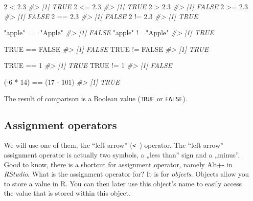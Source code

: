 \documentclass[
]{book}
\newenvironment{Shaded}{\begin{snugshade}}{\end{snugshade}}
\newcommand{\CommentTok}[1]{\textcolor[rgb]{0.56,0.35,0.01}{\textit{#1}}}
\newcommand{\ConstantTok}[1]{\textcolor[rgb]{0.00,0.00,0.00}{#1}}
\newcommand{\DecValTok}[1]{\textcolor[rgb]{0.00,0.00,0.81}{#1}}
\newcommand{\FloatTok}[1]{\textcolor[rgb]{0.00,0.00,0.81}{#1}}
\newcommand{\NormalTok}[1]{#1}
\newcommand{\SpecialCharTok}[1]{\textcolor[rgb]{0.00,0.00,0.00}{#1}}
\newcommand{\StringTok}[1]{\textcolor[rgb]{0.31,0.60,0.02}{#1}}
\begin{document}
\begin{Shaded}
\begin{Highlighting}[]
\DecValTok{2} \SpecialCharTok{\textless{}} \FloatTok{2.3}
\CommentTok{\#\textgreater{} [1] TRUE}
\DecValTok{2} \SpecialCharTok{\textless{}=} \FloatTok{2.3}
\CommentTok{\#\textgreater{} [1] TRUE}
\DecValTok{2} \SpecialCharTok{\textgreater{}} \FloatTok{2.3}
\CommentTok{\#\textgreater{} [1] FALSE}
\DecValTok{2} \SpecialCharTok{\textgreater{}=} \FloatTok{2.3}
\CommentTok{\#\textgreater{} [1] FALSE}
\DecValTok{2} \SpecialCharTok{==} \FloatTok{2.3}
\CommentTok{\#\textgreater{} [1] FALSE}
\DecValTok{2} \SpecialCharTok{!=} \FloatTok{2.3}
\CommentTok{\#\textgreater{} [1] TRUE}

\StringTok{"apple"} \SpecialCharTok{==} \StringTok{"Apple"}
\CommentTok{\#\textgreater{} [1] FALSE}
\StringTok{"apple"} \SpecialCharTok{!=} \StringTok{"Apple"}
\CommentTok{\#\textgreater{} [1] TRUE}

\ConstantTok{TRUE} \SpecialCharTok{==} \ConstantTok{FALSE}
\CommentTok{\#\textgreater{} [1] FALSE}
\ConstantTok{TRUE} \SpecialCharTok{!=} \ConstantTok{FALSE}
\CommentTok{\#\textgreater{} [1] TRUE}

\ConstantTok{TRUE} \SpecialCharTok{==} \DecValTok{1}
\CommentTok{\#\textgreater{} [1] TRUE}
\ConstantTok{TRUE} \SpecialCharTok{!=} \DecValTok{1}
\CommentTok{\#\textgreater{} [1] FALSE}

\NormalTok{(}\SpecialCharTok{{-}}\DecValTok{6} \SpecialCharTok{*} \DecValTok{14}\NormalTok{) }\SpecialCharTok{==}\NormalTok{ (}\DecValTok{17} \SpecialCharTok{{-}} \DecValTok{101}\NormalTok{)}
\CommentTok{\#\textgreater{} [1] TRUE}
\end{Highlighting}
\end{Shaded}

The result of comparison is a Boolean value (\texttt{TRUE} or \texttt{FALSE}).

\hypertarget{assignment-operators}{%
\subsection{Assignment operators}\label{assignment-operators}}

We will use one of them, the ``left arrow'' (\texttt{\textless{}-}) operator. The ``left arrow'' assignment operator is actually two symbols, a „less than'' sign and a „minus''. Good to know, there is a shortcut for assignment operator, namely Alt+- in \emph{RStudio}. What is the assignment operator for? It is for \emph{objects}. Objects allow you to store a value in R. You can then later use this object's name to easily access the value that is stored within this object.
\end{document}
